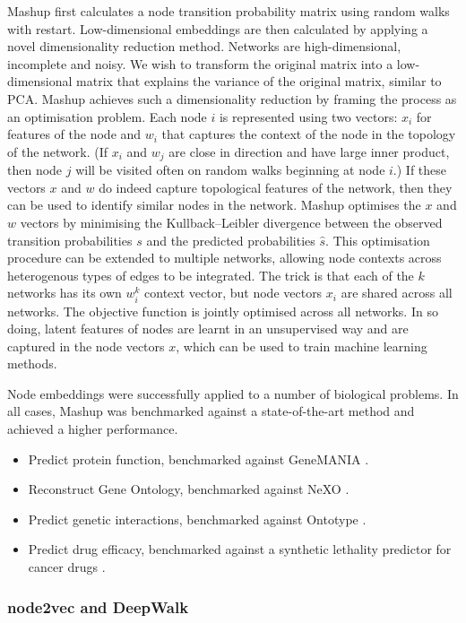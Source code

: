 Mashup first calculates a node transition probability matrix using random walks with restart. Low-dimensional embeddings are then calculated by applying a novel dimensionality reduction method. Networks are high-dimensional, incomplete and noisy. We wish to transform the original matrix into a low-dimensional matrix that explains the variance of the original matrix, similar to PCA. Mashup achieves such a dimensionality reduction by framing the process as an optimisation problem. Each node $i$ is represented using two vectors: $x_i$ for features of the node and $w_i$ that captures the context of the node in the topology of the network. (If $x_i$ and $w_j$ are close in direction and have large inner product, then node $j$ will be visited often on random walks beginning at node $i$.) If these vectors $x$ and $w$ do indeed capture topological features of the network, then they can be used to identify similar nodes in the network. Mashup optimises the $x$ and $w$ vectors by minimising the Kullback--Leibler divergence between the observed transition probabilities $s$ and the predicted probabilities $\hat{s}$. This optimisation procedure can be extended to multiple networks, allowing node contexts across heterogenous types of edges to be integrated. The trick is that each of the $k$ networks has its own $w_i^k$ context vector, but node vectors $x_i$ are shared across all networks. The objective function is jointly optimised across all networks. In so doing, latent features of nodes are learnt in an unsupervised way and are captured in the node vectors $x$, which can be used to train machine learning methods.

Node embeddings were successfully applied to a number of biological problems. In all cases, Mashup was benchmarked against a state-of-the-art method and achieved a higher performance.

\begin{itemize}
\item
  Predict protein function, benchmarked against GeneMANIA \cite{Franz2018}.
\item
  Reconstruct Gene Ontology, benchmarked against NeXO \cite{Dutkowski2013}.
\item
  Predict genetic interactions, benchmarked against Ontotype \cite{Yu2016}.
\item
  Predict drug efficacy, benchmarked against a synthetic lethality predictor for cancer drugs \cite{Jerby-Arnon2014}.
\end{itemize}

\subsubsection{node2vec and DeepWalk}

